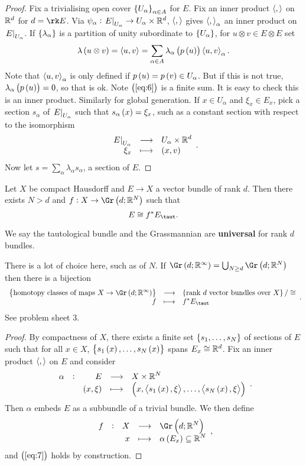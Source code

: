 \begin{proof}
Fix a trivialising open cover $ \cbr{U_\alpha}_{\alpha \in A} $ for $ E $. Fix an inner product $ \left\langle , \right\rangle $ on $ \mathbb{R}^d $ for $ d = \rk E $. Via $ \psi_\alpha : \left. E \right|_{U_\alpha} \to U_\alpha \times \mathbb{R}^d $, $ \left\langle , \right\rangle $ gives $ \left\langle , \right\rangle_\alpha $ an inner product on $ \left. E \right|_{U_\alpha} $. If $ \cbr{\lambda_\alpha} $ is a partition of unity subordinate to $ \cbr{U_\alpha} $, for $ u \otimes v \in E \otimes E $ set
\begin{equation}
\label{eq:6}
\lambda\br{u \otimes v} = \abr{u, v} = \sum_{\alpha \in A} \lambda_\alpha\br{p\br{u}}\abr{u, v}_{\alpha}.
\end{equation}
Note that $ \left\langle u, v \right\rangle_\alpha $ is only defined if $ p\br{u} = p\br{v} \in U_\alpha $. But if this is not true, $ \lambda_\alpha\br{p\br{u}} = 0 $, so that is ok. Note $ \br{\ref{eq:6}} $ is a finite sum. It is easy to check this is an inner product. Similarly for global generation. If $ x \in U_\alpha $ and $ \xi_x \in E_x $, pick a section $ s_\alpha $ of $ \left. E \right|_{U_\alpha} $ such that $ s_\alpha\br{x} = \xi_x $, such as a constant section with respect to the isomorphism
$$ \function{\eval{E}_{U_\alpha}}{U_\alpha \times \RR^d}{\xi_x}{\br{x, v}}. $$
Now let $ s = \sum_\alpha \lambda_\alpha s_\alpha $, a section of $ E $.
\end{proof}

\begin{corollary}
Let $ X $ be compact Hausdorff and $ E \to X $ a vector bundle of rank $ d $. Then there exists $ N > d $ and $ f : X \to \Gr\br{d; \RR^N} $ such that
\begin{equation}
\label{eq:7}
E \cong f^*E_{\taut}.
\end{equation}
\end{corollary}

We say the tautological bundle and the Grassmannian are \textbf{universal} for rank $ d $ bundles.

\begin{remark*}
There is a lot of choice here, such as of $ N $. If $ \Gr\br{d; \RR^\infty} = \bigcup_{N \ge d} \Gr\br{d; \RR^N} $ then there is a bijection
$$ \function{\cbr{\text{homotopy classes of maps} \ X \to \Gr\br{d; \RR^\infty}}}{\cbr{\text{rank} \ d \ \text{vector bundles over} \ X} / \cong}{f}{f^*E_{\taut}}. $$
See problem sheet $ 3 $.
\end{remark*}

\pagebreak

\begin{proof}
By compactness of $ X $, there exists a finite set $ \cbr{s_1, \dots, s_N} $ of sections of $ E $ such that for all $ x \in X $, $ \cbr{s_1\br{x}, \dots, s_N\br{x}} $ spans $ E_x \cong \mathbb{R}^d $. Fix an inner product $ \left\langle , \right\rangle $ on $ E $ and consider
$$ \function[\alpha]{E}{X \times \RR^N}{\br{x, \xi}}{\br{x, \abr{s_1\br{x}, \xi}, \dots, \abr{s_N\br{x}, \xi}}}. $$
Then $ \alpha $ embeds $ E $ as a subbundle of a trivial bundle. We then define
$$ \function[f]{X}{\Gr\br{d; \RR^N}}{x}{\alpha\br{E_x} \subseteq \RR^N}, $$
and $ \br{\ref{eq:7}} $ holds by construction.
\end{proof}

